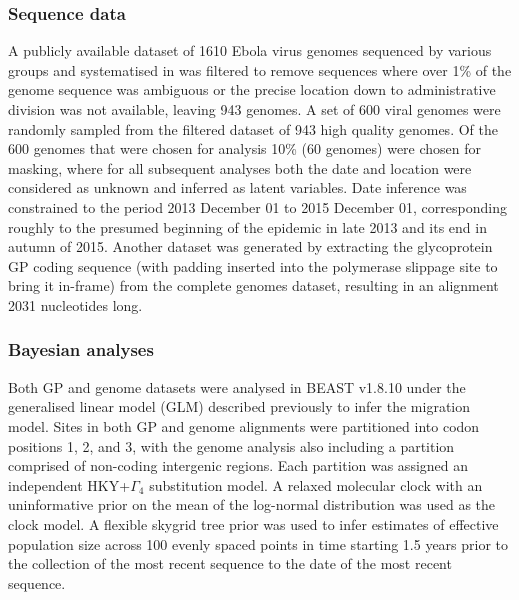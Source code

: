 \documentclass[11pt,oneside,letterpaper]{article}
\begin{document}
\subsubsection*{Sequence data}
A publicly available dataset of 1610 Ebola virus genomes sequenced by various groups \citep{baize_emergence_2014,gire_genomic_2014,park_ebola_2015,carroll_temporal_2015,kugelman_monitoring_2015,ladner_evolution_2015,simon-loriere_distinct_2015,tong_genetic_2015,arias_rapid_2016,smits_genotypic_2015,quick_rapid_2015} and systematised in \cite{dudas_virus_2017} was filtered to remove sequences where over 1\% of the genome sequence was ambiguous or the precise location down to administrative division was not available, leaving 943 genomes.
A set of 600 viral genomes were randomly sampled from the filtered dataset of 943 high quality genomes.
Of the 600 genomes that were chosen for analysis 10\% (60 genomes) were chosen for masking, where for all subsequent analyses both the date and location were considered as unknown and inferred as latent variables.
Date inference was constrained to the period 2013 December 01 to 2015 December 01, corresponding roughly to the presumed beginning of the epidemic in late 2013 and its end in autumn of 2015.
Another dataset was generated by extracting the glycoprotein GP coding sequence (with padding inserted into the polymerase slippage site to bring it in-frame) from the complete genomes dataset, resulting in an alignment 2031 nucleotides long.

\subsubsection*{Bayesian analyses}
Both GP and genome datasets were analysed in BEAST v1.8.10 \citep{suchard_bayesian_2018} under the generalised linear model (GLM) described previously \citep{faria_simultaneously_2013,lemey_unifying_2014,dudas_virus_2017} to infer the migration model.
Sites in both GP and genome alignments were partitioned into codon positions 1, 2, and 3, with the genome analysis also including a partition comprised of non-coding intergenic regions.
Each partition was assigned an independent HKY+$\Gamma_{4}$ \citep{hky_1985,yang_1994} substitution model.
A relaxed molecular clock \citep{drummond_2006} with an uninformative prior on the mean \citep{ferreira_bayesian_nodate} of the log-normal distribution was used as the clock model.
A flexible skygrid tree prior \citep{gill_2013} was used to infer estimates of effective population size across 100 evenly spaced points in time starting 1.5 years prior to the collection of the most recent sequence to the date of the most recent sequence.
\end{document}
